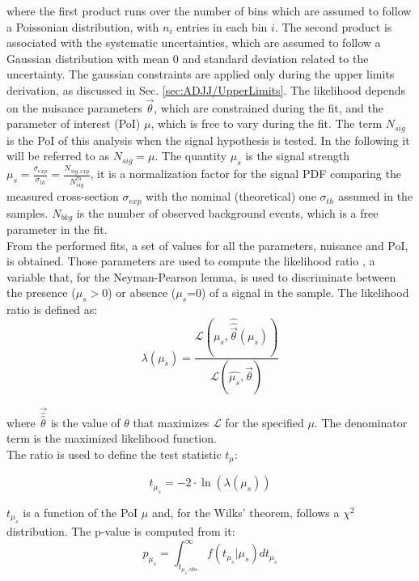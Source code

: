 \noindent where the first product runs over the number of bins which are assumed to follow a Poissonian distribution, with $n_i$ entries in each bin $i$.
The second product is associated with the systematic uncertainties, which are assumed to follow a Gaussian distribution with mean 0 and standard deviation related to the uncertainty.
The gaussian constraints are applied only during the upper limits derivation, as discussed in Sec. \ref{sec:ADJJ/UpperLimits}.
The likelihood depends on the nuisance parameters $\vec{\theta}$, which are constrained during the fit, and the parameter of interest (PoI) $\mu$, which is free to vary during the fit.
The term $N_{sig}$ is the PoI of this analysis when the signal hypothesis is tested.
In the following it will be referred to as $N_{sig} = \mu$.
The quantity $\mu_s$ is the signal strength $\mu_s=\frac{\sigma_{exp}}{\sigma_{th}}=\frac{N_{sig,exp}}{N^{th}_{sig}}$, it is a normalization factor for the signal PDF comparing the measured cross-section $\sigma_{exp}$ with the nominal (theoretical) one $\sigma_{th}$ assumed in the samples.
$N_{bkg}$ is the number of observed background events, which is a free parameter in the fit.\\
From the performed fits, a set of values for all the parameters, nuisance and PoI, is obtained.
Those parameters are used to compute the likelihood ratio \cite{Lik_tests}, a variable that, for the Neyman-Pearson lemma, is used to discriminate between the presence ($\mu_s >0$) or absence ($\mu_s$=0) of a signal in the sample.
The likelihood ratio is defined as:
\begin{equation}\label{eq:ADJJ/Validation/likelihood_ratio}
  \lambda(\mu_s) = \frac{\mathcal{L}(\mu_s, \hat{\hat{\vec{\theta}}}(\mu_s))}{\mathcal{L}(\hat{\mu_s}, \hat{\vec{\theta}})}
\end{equation}

\noindent where $\vec{\hat{\hat{\theta}}}$ is the value of $\theta$ that maximizes $\mathcal{L}$ for the specified $\mu$.
The denominator term is the maximized likelihood function.\\
The ratio is used to define the test statistic $t_{\mu}$:

\begin{equation}\label{eq:ADJJ/Validation/test_statistic}
  t_{\mu_s} = -2 \cdot \ln(\lambda(\mu_s))
\end{equation}

\noindent $t_{\mu_s}$ is a function of the PoI $\mu$ and, for the Wilks' theorem, follows a $\chi^2$ distribution.
The p-value is computed from it:
\begin{equation}\label{eq:ADJJ/Validation/p_value}
  p_{\mu_s} = \int_{t_{\mu_s,obs}}^{\infty} f(t_{\mu_s}|\mu_s) dt_{\mu_s}
\end{equation}

